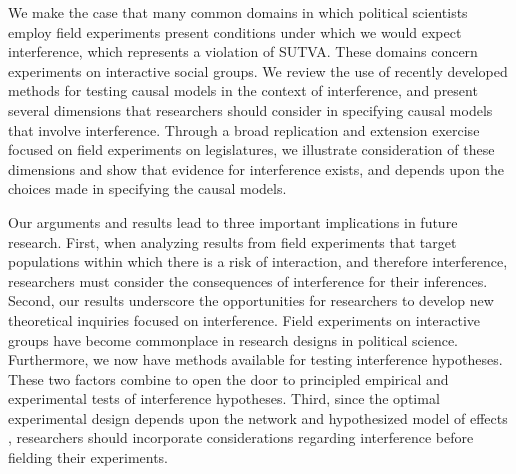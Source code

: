 \documentclass[12pt]{article}
\begin{document}
We make the case that many common domains in which political scientists employ field experiments present conditions under which we would expect interference, which represents a violation of SUTVA. These domains concern experiments on interactive social groups. We review the use of recently developed methods for testing causal models in the context of interference, and present several dimensions that researchers should consider in specifying causal models that involve interference. Through a broad replication and extension exercise focused on field experiments on legislatures, we illustrate consideration of these dimensions and show that evidence for interference exists, and depends upon the choices made in specifying the causal models.


Our arguments and results lead to three important implications in future research. First, when analyzing results from field experiments that target populations within which there is a risk of interaction, and therefore interference, researchers must consider the consequences of interference for their inferences. Second, our results underscore the opportunities for researchers to develop new theoretical inquiries focused on interference. Field experiments on interactive groups have become commonplace in research designs in political science. Furthermore, we now have methods available for testing interference hypotheses. These two factors combine to open the door to principled empirical and experimental tests of interference hypotheses. Third, since the optimal experimental design depends upon the network and hypothesized model of effects \citep{bowers2016models}, researchers should incorporate considerations regarding interference before fielding their experiments. %



\end{document}
